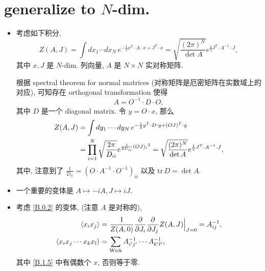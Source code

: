 \section{generalize to \texorpdfstring{$N$}{N}-dim.}
\begin{itemize}
	\item 考虑如下积分,
	\begin{equation} \label{B.1.1}
		Z(A, J) = \int dx_1 \cdots dx_N \, e^{- \frac{1}{2} x^T \cdot A \cdot x + J^T \cdot x} = \sqrt{\frac{(2 \pi)^N}{\det A}} e^{\frac{1}{2} J^T \cdot A^{- 1} \cdot J},
	\end{equation}
	其中 $x, J$ 是 $N$-dim. 列向量, $A$ 是 $N \times N$ 实对称矩阵.
	
	\begin{tcolorbox}[title=calculation:]
		根据 spectral theorem for normal matrices (对称矩阵是厄密矩阵在实数域上的对应), 可知存在 orthogonal transformation 使得
		\begin{equation}
			A = O^{- 1} \cdot D \cdot O,
		\end{equation}
		其中 $D$ 是一个 diagonal matrix. 令 $y = O \cdot x$, 那么
		\begin{align}
			Z(A, J) &= \int dy_1 \cdots dy_N \, e^{- \frac{1}{2} y^T \cdot D \cdot y + (O J)^T \cdot y} \notag \\
			&= \prod_{i = 1}^N \sqrt{\frac{2 \pi}{D_{i i}}} e^{\frac{1}{2 D_{i i}} {(O J)_i}^2} = \sqrt{\frac{(2 \pi)^N}{\det A}} e^{\frac{1}{2} J^T \cdot A^{- 1} \cdot J},
		\end{align}
		其中, 注意到了 $\frac{1}{D_{i i}} = (O \cdot A^{- 1} \cdot O^{- 1})_{i i}$ 以及 $\mathrm{tr} \, D = \det A$.
	\end{tcolorbox}
	
	\item 一个重要的变体是 $A \mapsto - i A, J \mapsto i J$.
	
	\item 考虑 \eqref{B.0.2} 的变体, (注意 $A$ 是对称的),
	\begin{align}
		\braket{x_i x_j} &= \frac{1}{Z(A, 0)} \frac{\partial}{\partial J_i} \frac{\partial}{\partial J_j} Z(A, J) \Big|_{J = 0} = A^{- 1}_{i j}, \\
		\braket{x_i x_j \cdots x_k x_l} &= \sum_{\text{Wick}} A^{- 1}_{i' j'} \cdots A^{- 1}_{k' l'}, \label{B.1.5}
	\end{align}
	其中 \eqref{B.1.5} 中有偶数个 $x$, 否则等于零.
	

\end{itemize}
